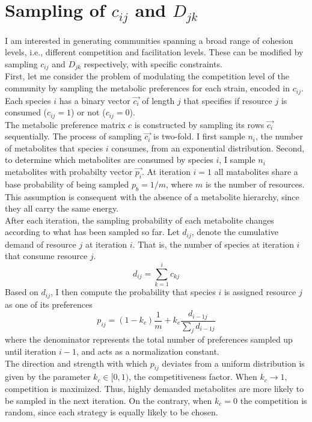 \documentclass[12pt]{article}
\begin{document}
	\section{Sampling of $ c_{ij} $ and $ D_{jk }$}
	I am interested in generating communities spanning a broad range of cohesion levels, i.e., different competition and facilitation levels. These can be modified by sampling $ c_{ij} $ and $ D_{jk} $ respectively, with specific constraints.\\

	First, let me consider the problem of modulating the competition level of the community by sampling the metabolic preferences for each strain, encoded in  $ c_{ij} $. Each species $ i $ has a binary vector $ \vec{c_i} $ of length $ j $ that specifies if resource $ j $ is consumed ($ c_{ij} = 1 $) or not ($ c_{ij} = 0 $). \\
	The metabolic preference matrix $ c $ is constructed by sampling its rows $ \vec{c_i} $ sequentially. The process of sampling $ \vec{c_i} $ is two-fold. I first sample $ n_i $, the number of metabolites that species $ i $ consumes, from an exponential distribution. Second, to determine which metabolites are consumed by species $ i $, I sample $ n_i $ metabolites with probabilty vector $ \vec{p_i} $. At iteration $ i = 1 $ all matabolites share a base probability of being sampled $ p_b = 1/m $, where $ m $ is the number of resources. This assumption is consequent with the absence of a metabolite hierarchy, since they all carry the same energy. \\
	After each iteration, the sampling probability of each metabolite changes according to what has been sampled so far. Let $ d_{ij} $, denote the cumulative demand of resource $ j $ at iteration $ i $. That is, the number of species at iteration $ i $ that consume resource $ j $.
	\begin{equation}
		d_{ij}  = \sum_{k = 1}^{i}c_{kj}
	\end{equation}
	Based on $ d_{ij} $, I then compute the probability that species $ i $ is assigned resource $ j $ as one of its preferences
	\begin{equation}\label{sampling_probability}
		p_{ij}= (1-k_c) \frac{1}{m}  + k_c \frac{d_{i -1j}}{\sum_{j}d_{i-1j}}
	\end{equation}
	where the denominator represents the total number of preferences sampled up until iteration $ i-1 $, and acts as a normalization constant.\\
	The direction and strength with which $ p_{ij} $ deviates from a uniform distribution is given by the parameter $ k_c \in [0, 1)$, the competitiveness factor. When $ k_c \rightarrow 1 $, competition is maximized. Thus, highly demanded metabolites are more likely to be sampled in the next iteration. On the contrary, when $ k_c = 0 $ the competition is random, since each strategy is equally likely to be chosen. \par
	
\end{document}

